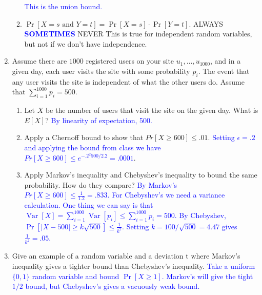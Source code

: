 \documentclass[10pt]{article}
\DeclareMathOperator*{\Var}{Var}
\begin{document}
\begin{enumerate}
\begin{enumerate}[label=(\alph*)]
		\textcolor{blue}{This is the union bound.}
		\item $\Pr[{X} = s \text{ and } {Y} = t] = \Pr[{X} = s] \cdot \Pr[{Y} = t]$. \hspace{1em}ALWAYS\hspace{1em} \textcolor{blue}{\textbf{SOMETIMES}}\hspace{1em} NEVER
		This is true for independent random variables, but not if we don't have independence.
		
	\end{enumerate}
	\item Assume there are $1000$ registered users on your site $u_1, \ldots, u_{1000}$, and in a given day, each user
	visits the site with some probability $p_i$. The event that any user visits the site is independent of what the other users do. Assume that $\sum_{i=1}^{1000} p_i = 500$. 
	\begin{enumerate}
		\item  Let $X$ be the number of users that visit the site on the given day. What is $E[X]$?
		\textcolor{blue}{{By linearity of expectation, 500}.}
		\item Apply a Chernoff bound to show that $Pr[X \geq 600] \leq .01$. \textcolor{blue}{Setting $\epsilon = .2$ and applying the bound from class we have $Pr[X \geq 600] \leq e^{-.2^2 500/2.2} = .0001$}.
		\item Apply Markov’s inequality and Chebyshev’s inequality to bound the same probability.
		How do they compare?
		\textcolor{blue}{By Markov's $Pr[X \geq 600] \leq \frac{1}{1.2} = .833$. For Chebyshev's we need a variance calculation. One thing we can say is that $\Var[X] = \sum_{i=1}^{1000} \Var[p_i] \leq \sum_{i=1}^{1000}p_i = 500$. By Chebyshev, $\Pr[|X-500| \geq k\sqrt{500}] \leq \frac{1}{k^2}$. Setting $k = 100/\sqrt{500} = 4.47$ gives $\frac{1}{k^2} = .05$.}
	\end{enumerate}
	\item Give an example of a random variable and a deviation t where Markov’s inequality gives a	tighter bound than Chebyshev’s inequality.
	\textcolor{blue}{Take a uniform $\{0,1\}$ random variable and bound $\Pr[X \geq 1]$. Markov's will give the tight $1/2$ bound, but Chebyshev's gives a vacuously weak bound.}
\end{enumerate}
\end{document}
